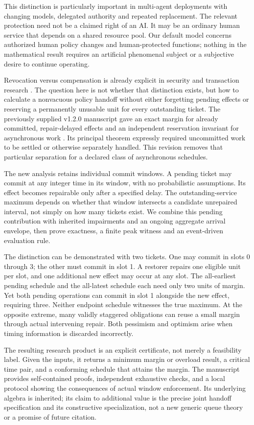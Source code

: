 \documentclass[11pt,a4paper]{article}
\theoremstyle{definition}\newtheorem{definition}{Definition}
\begin{document}
This distinction is particularly important in multi-agent deployments with changing models, delegated authority and repeated replacement. The relevant protection need not be a claimed right of an AI. It may be an ordinary human service that depends on a shared resource pool. Our default model concerns authorized human policy changes and human-protected functions; nothing in the mathematical result requires an artificial phenomenal subject or a subjective desire to continue operating.

Revocation versus compensation is already explicit in security and transaction research \cite{quiescence,sagas,escrow}. The question here is not whether that distinction exists, but how to calculate a nonvacuous policy handoff without either forgetting pending effects or reserving a permanently unusable unit for every outstanding ticket. The previously supplied v1.2.0 manuscript gave an exact margin for already committed, repair-delayed effects and an independent reservation invariant for asynchronous work \cite{previous}. Its principal theorem expressly required uncommitted work to be settled or otherwise separately handled. This revision removes that particular separation for a declared class of asynchronous schedules.

The new analysis retains individual commit windows. A pending ticket may commit at any integer time in its window, with no probabilistic assumptions. Its effect becomes repairable only after a specified delay. The outstanding-service maximum depends on whether that window intersects a candidate unrepaired interval, not simply on how many tickets exist. We combine this pending contribution with inherited impairments and an ongoing aggregate arrival envelope, then prove exactness, a finite peak witness and an event-driven evaluation rule.

The distinction can be demonstrated with two tickets. One may commit in slots 0 through 3; the other must commit in slot 1. A restorer repairs one eligible unit per slot, and one additional new effect may occur at any slot. The all-earliest pending schedule and the all-latest schedule each need only two units of margin. Yet both pending operations can commit in slot 1 alongside the new effect, requiring three. Neither endpoint schedule witnesses the true maximum. At the opposite extreme, many validly staggered obligations can reuse a small margin through actual intervening repair. Both pessimism and optimism arise when timing information is discarded incorrectly.

The resulting research product is an explicit certificate, not merely a feasibility label. Given the inputs, it returns a minimum margin or overload result, a critical time pair, and a conforming schedule that attains the margin. The manuscript provides self-contained proofs, independent exhaustive checks, and a local protocol showing the consequences of actual window enforcement. Its underlying algebra is inherited; its claim to additional value is the precise joint handoff specification and its constructive specialization, not a new generic queue theory or a promise of future citation.
\end{document}

